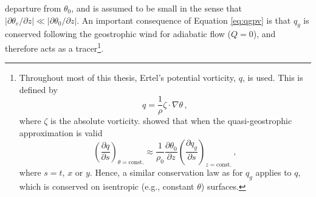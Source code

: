 departure from $\theta_0$, and is assumed to be small in the sense that
$|\partial\theta_e/\partial z| \ll |\partial\theta_0/\partial z|$. An important
consequence of Equation \ref{eq:qgpv} is that $q_g$ is conserved following the
geostrophic wind for adiabatic flow ($Q=0$), and therefore acts as a
tracer\footnote{Throughout most of this thesis, Ertel's potential vorticity,
  $q$, is used. This is defined by
\begin{equation*}
  q = \frac{1}{\rho}\zeta\cdot\nabla\theta \, , 
\end{equation*}
where
$\zeta$ is the absolute vorticity. \citet{Charney1962} showed that when the
quasi-geostrophic approximation is valid
\begin{equation*}
\left(\frac{\partial q}{\partial s}\right)_{\theta=\mathrm{const.}} \approx
\frac{1}{\rho_0}\frac{\partial \theta_0}{\partial z}\left(\frac{\partial
    q_g}{\partial s}\right)_{z=\mathrm{const.}} \, ,
\end{equation*}
where $s = t$, $x$ or $y$. Hence, a similar conservation law as for
$q_g$ applies to $q$, which is conserved on isentropic (e.g., constant
$\theta$) surfaces.  }.

